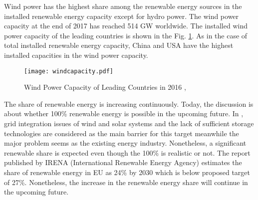 Wind power has the highest share among the renewable energy sources in the installed renewable energy capacity except for hydro power. The wind power capacity at the end of 2017 has reached 514 GW worldwide\cite{InternationalRenewableEnergyAgencyIRENA2018}. The installed wind power capacity of the leading countries is shown in the Fig. \ref{windcap}. As in the case of total installed renewable energy capacity, China and USA have the highest installed capacities in the wind power capacity. \par
\begin{figure}[h!]
	\centering
	\texttt{[image: windcapacity.pdf]}
	\caption[Installed Renewable Energy Capacity of Leading Countries]{Wind Power Capacity of Leading Countries in 2016 \cite{InternationalRenewableEnergyAgencyIRENA2018},\cite{InternationalRenewableEnergyAgency2017}}
	\label{windcap}
\end{figure}
The share of renewable energy is increasing continuously. Today, the discussion is about whether 100\% renewable energy is possible in the upcoming future. In \cite{REN212017d}, grid integration issues of wind and solar systems and the lack of sufficient storage technologies are considered as the main barrier for this target meanwhile the major problem seems as the existing energy industry. Nonetheless, a significant renewable share is expected even though the 100\% is realistic or not. The report published by IRENA (International Renewable Energy Agency) estimates the share of renewable energy in EU as 24\% by 2030 which is below proposed target of 27\%\cite{IRENA2014}. Nonetheless, the increase in the renewable energy share will continue in the upcoming future. \par
 
